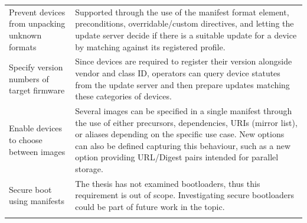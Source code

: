 \documentclass[0-thesis.tex]{subfiles}
\begin{document}
\begin{longtable}[]{@{}ll@{}}
    \begin{minipage}[t]{0.41\columnwidth}\raggedright\strut
    Prevent devices from unpacking unknown formats\strut
    \end{minipage} & \begin{minipage}[t]{0.53\columnwidth}\raggedright\strut
    Supported through the use of the manifest format element, preconditions,
    overridable/custom directives, and letting the update server decide if
    there is a suitable update for a device by matching against its
    registered profile.\strut
    \end{minipage}\tabularnewline
    \begin{minipage}[t]{0.41\columnwidth}\raggedright\strut
    Specify version numbers of target firmware\strut
    \end{minipage} & \begin{minipage}[t]{0.53\columnwidth}\raggedright\strut
    Since devices are required to register their version alongside vendor
    and class ID, operators can query device statutes from the update server
    and then prepare updates matching these categories of devices.\strut
    \end{minipage}\tabularnewline
    \begin{minipage}[t]{0.41\columnwidth}\raggedright\strut
    Enable devices to choose between images\strut
    \end{minipage} & \begin{minipage}[t]{0.53\columnwidth}\raggedright\strut
    Several images can be specified in a single manifest through the use of
    either precursors, dependencies, URIs (mirror list), or aliases
    depending on the specific use case. New options can also be defined
    capturing this behaviour, such as a new option providing URL/Digest
    pairs intended for parallel storage.\strut
    \end{minipage}\tabularnewline
    \begin{minipage}[t]{0.41\columnwidth}\raggedright\strut
    Secure boot using manifests\strut
    \end{minipage} & \begin{minipage}[t]{0.53\columnwidth}\raggedright\strut
    The thesis has not examined bootloaders, thus this requirement is out of
    scope. Investigating secure bootloaders could be part of future work in
    the topic.\strut
    \end{minipage}\tabularnewline
    \begin{minipage}[t]{0.41\columnwidth}\raggedright\strut

\end{minipage}
\end{longtable}
\end{document}
